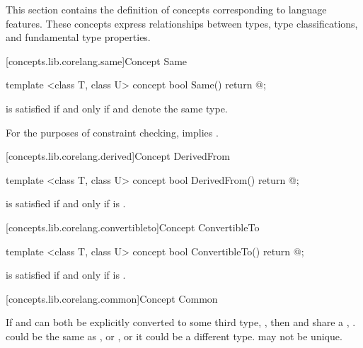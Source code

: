 \begin{addedblock}
\pnum
This section contains the definition of concepts corresponding to language features.
These concepts express relationships between types, type classifications, and
fundamental type properties.

[concepts.lib.corelang.same]{Concept Same}

%
\begin{itemdecl}
template <class T, class U>
concept bool Same() {
  return @\seebelow@;
}
\end{itemdecl}

\begin{itemdescr}
\pnum
{} is satisfied if and
only if  and  denote the same type.

\pnum
\remarks For the purposes of constraint checking,  implies
.
\end{itemdescr}

[concepts.lib.corelang.derived]{Concept DerivedFrom}

%
\begin{itemdecl}
template <class T, class U>
concept bool DerivedFrom() {
  return @\seebelow@;
}
\end{itemdecl}

\begin{itemdescr}
\pnum
{} is satisfied if and only if
 is .
\end{itemdescr}

[concepts.lib.corelang.convertibleto]{Concept ConvertibleTo}

%
\begin{itemdecl}
template <class T, class U>
concept bool ConvertibleTo() {
  return @\seebelow@;
}
\end{itemdecl}

\begin{itemdescr}
\pnum
{} is satisfied
if and only if  is .
\end{itemdescr}

[concepts.lib.corelang.common]{Concept Common}

\pnum
If  and  can both be explicitly converted to some third type,
, then  and  share a ,
. \enternote {} could be the same as , or , or
it could be a different type.  may not be unique.\exitnote


\end{addedblock}
